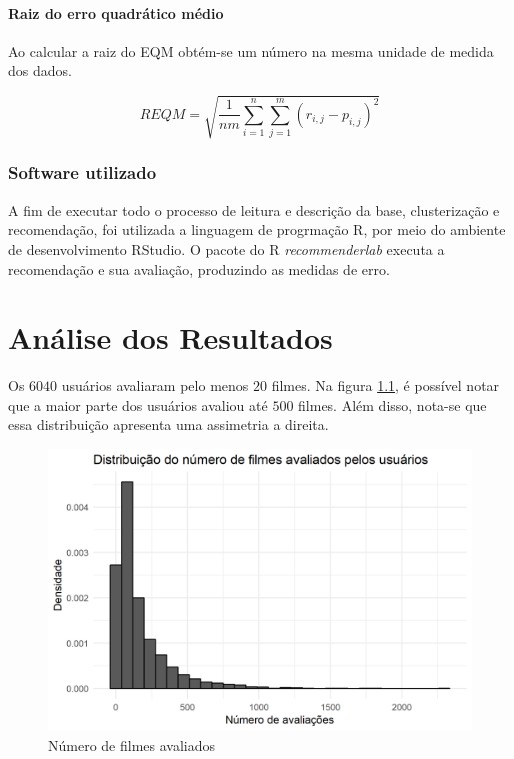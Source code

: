 \documentclass[12pt,a4paper,header]{abnt}
\begin{document}
\subsubsection{Raiz do erro quadrático médio}

Ao calcular a raiz do EQM obtém-se um número na mesma unidade de medida dos dados.

\begin{equation}
REQM = \sqrt{\frac{1}{nm} \sum_{i=1}^{n} \sum_{j=1}^m \left( r_{i,j} - p_{i,j}  \right)^2}
\end{equation}

\subsection{Software utilizado}

A fim de executar todo o processo de leitura e descrição da base, clusterização e recomendação, foi utilizada a linguagem de progrmação R\cite{R}, por meio do ambiente de desenvolvimento RStudio\cite{RStudio}. O pacote do R \textit{recommenderlab}\cite{recommenderlab} executa a recomendação e sua avaliação, produzindo as medidas de erro.

\chapter{Análise dos Resultados}

Os $6040$ usuários avaliaram pelo menos $20$ filmes. Na figura \ref{hist_num_ratings}, é possível notar que a maior parte dos usuários avaliou até $500$ filmes. Além disso, nota-se que essa distribuição apresenta uma assimetria a direita.

\begin{figure}[h]
\centering
\includegraphics[]{../R/img/Distribuicao_ratings.png}
\caption{Número de filmes avaliados}
\label{hist_num_ratings}
\end{figure}
\end{document}
